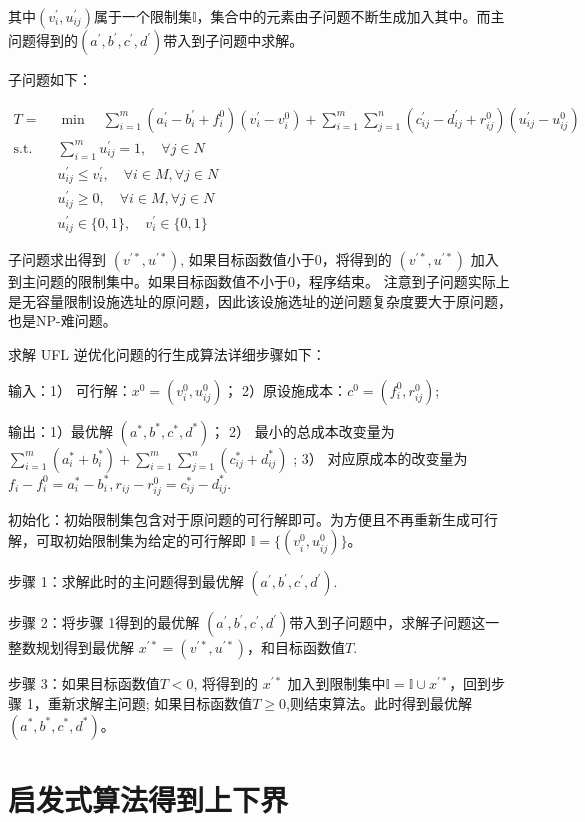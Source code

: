 \documentclass[UTF8]{article}
\begin{document}
其中$(v_i^{'},u_{ij}^{'})$属于一个限制集$\mathbb{I}$，集合中的元素由子问题不断生成加入其中。而主问题得到的$(a^{'},b^{'},c^{'},d^{'})$带入到子问题中求解。

子问题如下：

\begin{align*}
T = &\min \quad \sum_{i=1}^m(a_i^{'}-b_i^{'}+f_i^0)(v_i^{'}-v_i^{0})+\sum_{i=1}^m\sum_{j=1}^n(c_{ij}^{'}-d_{ij}^{'}+r_{ij}^0)(u_{ij}^{'}-u_{ij}^{0}) \\
\text{s.t.}\quad & \sum_{i=1}^m u_{ij}^{'} =1, \quad \forall j\in N \\
& u_{ij}^{'} \leq v_{i}^{'}, \quad \forall i \in M, \forall j \in N \\
& u_{ij}^{'} \geq 0, \quad \forall i \in M, \forall j \in N \\
&u_{ij}^{'} \in \{0,1\} ,\quad v_{i}^{'} \in \{0,1\}
\end{align*}

子问题求出得到 $(v^{'*},u^{'*})$, 如果目标函数值小于0，将得到的 $(v^{'*},u^{'*})$ 加入到主问题的限制集中。如果目标函数值不小于0，程序结束。
注意到子问题实际上是无容量限制设施选址的原问题，因此该设施选址的逆问题复杂度要大于原问题，也是NP-难问题。

求解 UFL 逆优化问题的行生成算法详细步骤如下：

输入：1） 可行解：$x^0=(v_i^0,u_{ij}^0)$； 2）原设施成本：$c^0=(f_i^0,r_{ij}^0)$;

输出：1）最优解 $(a^{*},b^{*},c^{*},d^{*})$；
2） 最小的总成本改变量为
$\sum_{i=1}^m(a^{*}_i+b^{*}_i)+\sum_{i=1}^m\sum_{j=1}^n(c^{*}_{ij}+d^{*}_{ij})$ ;
3） 对应原成本的改变量为 $f_i-f_i^0 = a^{*}_i-b^{*}_i,r_{ij}-r_{ij}^0=c^{*}_{ij}-d^{*}_{ij}$.

初始化：初始限制集包含对于原问题的可行解即可。为方便且不再重新生成可行解，可取初始限制集为给定的可行解即 $\mathbb{I} = \{(v_i^0,u_{ij}^0)\} $。

步骤 1：求解此时的主问题得到最优解 $(a^{'},b^{'},c^{'},d^{'})$.

步骤 2：将步骤 1得到的最优解 $(a^{'},b^{'},c^{'},d^{'})$带入到子问题中，求解子问题这一整数规划得到最优解 $x^{'*}=(v^{'*},u^{'*})$，和目标函数值$T$.

步骤 3：如果目标函数值$T< 0$, 将得到的 $x^{'*}$ 加入到限制集中$\mathbb{I} = \mathbb{I} \cup x^{'*}$，回到步骤 1，重新求解主问题;  如果目标函数值$T\geq 0$,则结束算法。此时得到最优解$(a^{*},b^{*},c^{*},d^{*})$。


\section{启发式算法得到上下界}
\end{document}
